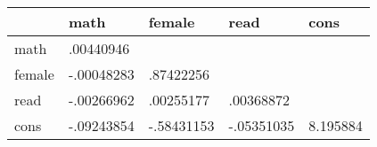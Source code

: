 \begin{table}[htbp]
\begin{tabular}{|l|l|l|l|l|}\hline  
 & math  & female  & read  & cons  \\ \hline  
math & .00440946 \\ \hline 
female & -.00048283 & .87422256 \\ \hline 
read & -.00266962 & .00255177 & .00368872 \\ \hline 
cons & -.09243854 & -.58431153 & -.05351035 & 8.195884 \\ \hline 
  \end{tabular}
\end{table}
